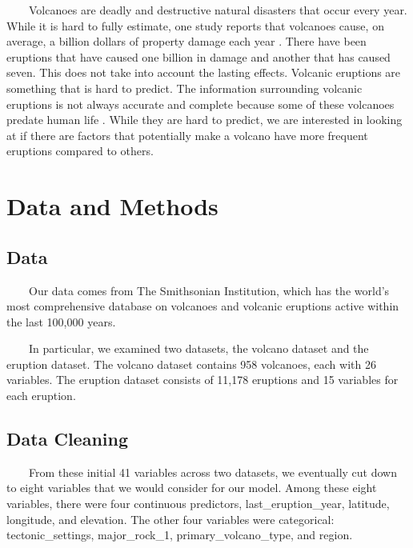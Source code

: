 \documentclass[
  12pt,
]{article}
\begin{document}
~~~~Volcanoes are deadly and destructive natural disasters that occur
every year. While it is hard to fully estimate, one study reports that
volcanoes cause, on average, a billion dollars of property damage each
year . There have been eruptions that have caused one billion in damage
and another that has caused seven\citep{britannica2025}. This does not
take into account the lasting effects. Volcanic eruptions are something
that is hard to predict. The information surrounding volcanic eruptions
is not always accurate and complete because some of these volcanoes
predate human life \citep{smithsonian2023}. While they are hard to
predict, we are interested in looking at if there are factors that
potentially make a volcano have more frequent eruptions compared to
others.

\section{Data and Methods}\label{data-and-methods}

\subsection{Data}\label{data}

~~~~Our data comes from The Smithsonian Institution, which has the
world's most comprehensive database on volcanoes and volcanic eruptions
active within the last 100,000 years.

~~~~In particular, we examined two datasets, the volcano dataset and the
eruption dataset. The volcano dataset contains 958 volcanoes, each with
26 variables. The eruption dataset consists of 11,178 eruptions and 15
variables for each eruption.

\subsection{Data Cleaning}\label{data-cleaning}

~~~~From these initial 41 variables across two datasets, we eventually
cut down to eight variables that we would consider for our model. Among
these eight variables, there were four continuous predictors,
last\_eruption\_year, latitude, longitude, and elevation. The other four
variables were categorical: tectonic\_settings, major\_rock\_1,
primary\_volcano\_type, and region.
\end{document}
